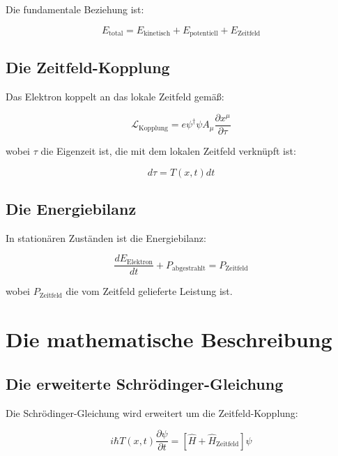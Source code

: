 \documentclass[12pt,a4paper]{report}
\begin{document}
	Die fundamentale Beziehung ist:
	
	\begin{equation}
		E_{\text{total}} = E_{\text{kinetisch}} + E_{\text{potentiell}} + E_{\text{Zeitfeld}}
	\end{equation}
	
	\subsection{Die Zeitfeld-Kopplung}
	
	Das Elektron koppelt an das lokale Zeitfeld gemäß:
	
	\begin{equation}
		\mathcal{L}_{\text{Kopplung}} = e\psi^\dagger\psi A_\mu \frac{\partial x^\mu}{\partial \tau}
	\end{equation}
	
	wobei $\tau$ die Eigenzeit ist, die mit dem lokalen Zeitfeld verknüpft ist:
	
	\begin{equation}
		d\tau = T(x,t) dt
	\end{equation}
	
	\subsection{Die Energiebilanz}
	
	In stationären Zuständen ist die Energiebilanz:
	
	\begin{equation}
		\frac{dE_{\text{Elektron}}}{dt} + P_{\text{abgestrahlt}} = P_{\text{Zeitfeld}}
	\end{equation}
	
	wobei $P_{\text{Zeitfeld}}$ die vom Zeitfeld gelieferte Leistung ist.
	
	\section{Die mathematische Beschreibung}
	
	\subsection{Die erweiterte Schrödinger-Gleichung}
	
	Die Schrödinger-Gleichung wird erweitert um die Zeitfeld-Kopplung:
	
	\begin{equation}
		i\hbar T(x,t)\frac{\partial\psi}{\partial t} = \left[\hat{H} + \hat{H}_{\text{Zeitfeld}}\right]\psi
	\end{equation}
	
\end{document}
